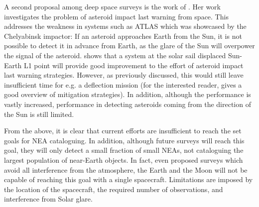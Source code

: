 A second proposal among deep space surveys is the work of \cite{ThesisOlga}. Her work investigates the problem of asteroid impact last warning from space. This addresses the weakness in systems such as ATLAS which was showcased by the Chelyabinsk impactor: If an asteroid approaches Earth from the Sun, it is not possible to detect it in advance from Earth, as the glare of the Sun will overpower the signal of the asteroid. \cite{ThesisOlga} shows that a system at the solar sail displaced Sun-Earth L1 point will provide good improvement to the effort of asteroid impact last warning strategies. However, as previously discussed, this would still leave insufficient time for e.g. a deflection mission (for the interested reader, \cite{DefendingEarth} gives a good overview of mitigation strategies). In addition, although the performance is vastly increased, performance in detecting asteroids coming from the direction of the Sun is still limited.

From the above, it is clear that current efforts are insufficient to reach the set goals for NEA cataloguing. In addition, although future surveys will reach this goal, they will only detect a small fraction of small NEAs, not cataloguing the largest population of near-Earth objects. In fact, even proposed surveys which avoid all interference from the atmosphere, the Earth and the Moon will not be capable of reaching this goal with a single spacecraft. Limitations are imposed by the location of the spacecraft, the required number of observations, and interference from Solar glare.

